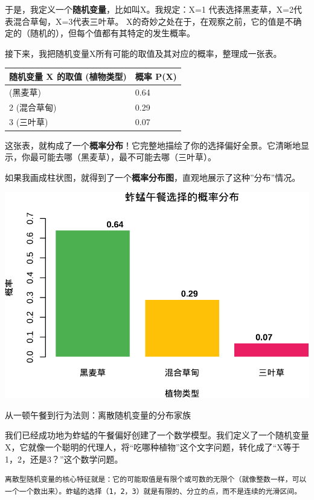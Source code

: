 \documentclass[
]{book}
\begin{document}
于是，我定义一个\textbf{随机变量}，比如叫X。我规定：X=1 代表选择黑麦草，X=2代表混合草甸，X=3代表三叶草。
X的奇妙之处在于，在观察之前，它的值是不确定的（随机的），但每个值都有其特定的发生概率。

接下来，我把随机变量X所有可能的取值及其对应的概率，整理成一张表。

\begin{longtable}[]{@{}ll@{}}
\toprule\noalign{}
随机变量 X 的取值 (植物类型) & 概率 P(X) \\
\midrule\noalign{}
\endhead
\bottomrule\noalign{}
\endlastfoot
1 (黑麦草) & 0.64 \\
2 (混合草甸) & 0.29 \\
3 (三叶草) & 0.07 \\
\end{longtable}

这张表，就构成了一个\textbf{概率分布}！它完整地描绘了你的选择偏好全景。它清晰地显示，你最可能去哪（黑麦草），最不可能去哪（三叶草）。

如果我画成柱状图，就得到了一个\textbf{概率分布图}，直观地展示了这种''分布''情况。

\begin{center}\includegraphics[width=0.8\linewidth]{ecological-statistics_files/figure-latex/unnamed-chunk-4-1} \end{center}

从一顿午餐到行为法则：离散随机变量的分布家族

我们已经成功地为蚱蜢的午餐偏好创建了一个数学模型。我们定义了一个随机变量X，它就像一个聪明的代理人，将``吃哪种植物''这个文字问题，转化成了``X等于1，2，还是3？''这个数学问题。

\begin{verbatim}
离散型随机变量的核心特征就是：它的可能取值是有限个或可数的无限个（就像整数一样，可以一个一个数出来）。蚱蜢的选择（1，2，3）就是有限的、分立的点，而不是连续的光滑区间。
\end{verbatim}
\end{document}
